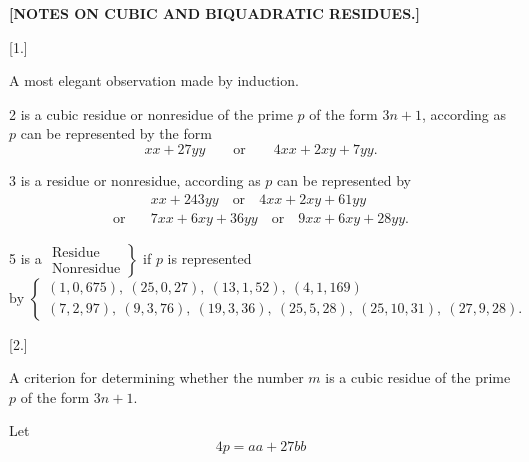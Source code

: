\clearpage{}
\begin{center}\bfseries [NOTES ON CUBIC AND BIQUADRATIC RESIDUES.]\end{center}
\begin{center}[1.]\par\smallskip A most elegant observation made by induction.\end{center}
\noindent\hspace*{\parindent}2 is a cubic residue or nonresidue of the prime $p$ of the form $3n+1$, according as $p$ can be represented by the form
\[xx+27yy\qquad\text{or}\qquad4xx+2xy+7yy.\]
\par\noindent\hspace*{\parindent}3 is a residue or nonresidue, according as $p$ can be represented by
\[\begin{aligned} &xx+243yy\quad\text{or}\quad4xx+2xy+61yy\\
\text{or}\quad&7xx+6xy+36yy\quad\text{or}\quad9xx+6xy+28yy.\end{aligned}\]
\par\noindent\hspace*{\parindent}5 is a $\left.\begin{array}{l}\text{Residue}\\\text{Nonresidue}\end{array}\right\}$ if $p$ is represented
\begingroup\small
\[\text{by }\left\{\begin{array}{l}(1,0,675),\ (25,0,27),\ (13,1,52),\ (4,1,169)\\
(7,2,97),\ (9,3,76),\ (19,3,36),\ (25,5,28),\ (25,10,31),\ (27,9,28).\end{array}\right.\]
\endgroup
\begin{center}[2.]\end{center}
\noindent\hspace*{\parindent}A criterion for determining whether the number $m$ is a cubic residue of the prime $p$ of the form $3n+1$.

Let
\[4p=aa+27bb\]
